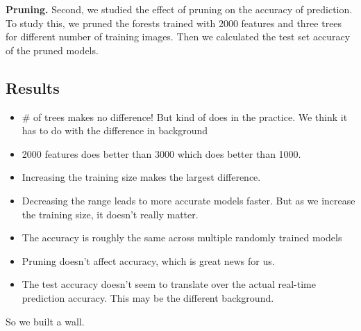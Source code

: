 \textbf{Pruning.} Second, we studied the effect of pruning on the accuracy of prediction. To study this, we pruned the forests trained with 2000 features and three trees for different number of training images. Then we calculated the test set accuracy of the pruned models.



\subsection{Results}
\begin{itemize}
	\item \# of trees makes no difference! But kind of does in the practice. We think it has to do with the difference in background
	\item 2000 features does better than 3000 which does better than 1000.
	\item Increasing the training size makes the largest difference.
	\item Decreasing the range leads to more accurate models faster. But as we increase the training size, it doesn't really matter.
	\item The accuracy is roughly the same across multiple randomly trained models
	\item Pruning doesn't affect accuracy, which is great news for us.
	\item The test accuracy doesn't seem to translate over the actual real-time prediction accuracy. This may be the different background.
\end{itemize}

So we built a wall.